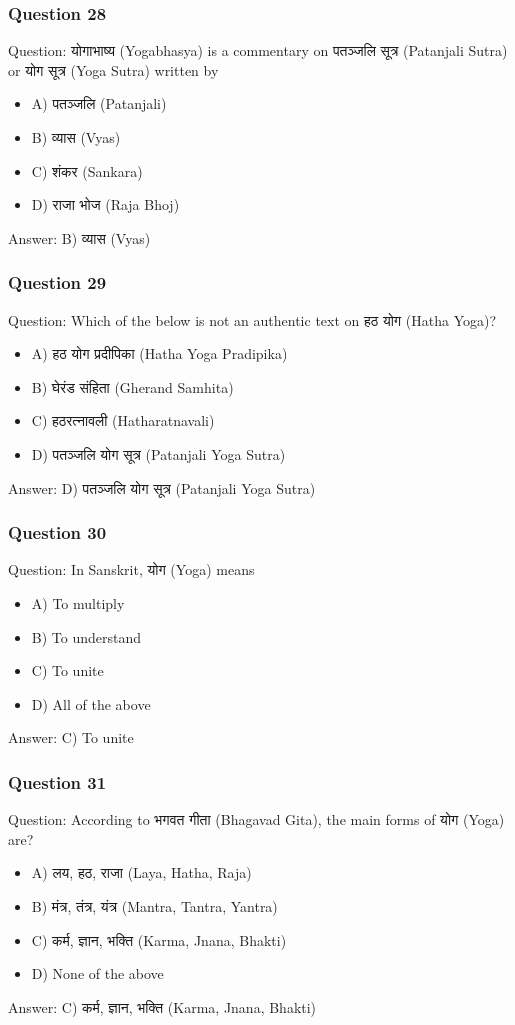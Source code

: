 \begin{frame}[fragile]\frametitle{Question 28}
Question: योगाभाष्य (Yogabhasya) is a commentary on पतञ्जलि सूत्र (Patanjali Sutra) or योग सूत्र (Yoga Sutra) written by
\begin{itemize}
\item A) पतञ्जलि (Patanjali)
\item B) व्यास (Vyas)
\item C) शंकर (Sankara)
\item D) राजा भोज (Raja Bhoj)
\end{itemize}
Answer: B) व्यास (Vyas)
\end{frame}

\begin{frame}[fragile]\frametitle{Question 29}
Question: Which of the below is not an authentic text on हठ योग (Hatha Yoga)?
\begin{itemize}
\item A) हठ योग प्रदीपिका (Hatha Yoga Pradipika)
\item B) घेरंड संहिता (Gherand Samhita)
\item C) हठरत्नावली (Hatharatnavali)
\item D) पतञ्जलि योग सूत्र (Patanjali Yoga Sutra)
\end{itemize}
Answer: D) पतञ्जलि योग सूत्र (Patanjali Yoga Sutra)
\end{frame}

\begin{frame}[fragile]\frametitle{Question 30}
Question: In Sanskrit, योग (Yoga) means
\begin{itemize}
\item A) To multiply
\item B) To understand
\item C) To unite
\item D) All of the above
\end{itemize}
Answer: C) To unite
\end{frame}

\begin{frame}[fragile]\frametitle{Question 31}
Question: According to भगवत गीता (Bhagavad Gita), the main forms of योग (Yoga) are?
\begin{itemize}
\item A) लय, हठ, राजा (Laya, Hatha, Raja)
\item B) मंत्र, तंत्र, यंत्र (Mantra, Tantra, Yantra)
\item C) कर्म, ज्ञान, भक्ति (Karma, Jnana, Bhakti)
\item D) None of the above
\end{itemize}
Answer: C) कर्म, ज्ञान, भक्ति (Karma, Jnana, Bhakti)
\end{frame}

